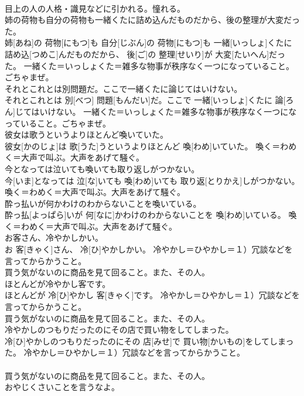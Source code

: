 \documentclass[8pt]{extreport}
\begin{document}
\begin{CJK}{UTF8}{min}
{\\	目上の人の人格・識見などに引かれる。憧れる。
\\	姉の荷物も自分の荷物も一緒くたに詰め込んだものだから、後の整理が大変だった。	
\\	姉[あね]の 荷物[にもつ]も 自分[じぶん]の 荷物[にもつ]も 一緒[いっしょ]くたに 詰め込[つめこ]んだものだから、 後[ご]の 整理[せいり]が 大変[たいへん]だった。	一緒くた＝いっしょくた＝雑多な物事が秩序なく一つになっていること。ごちゃまぜ。
\\	それとこれとは別問題だ。ここで一緒くたに論じてはいけない。	
\\	それとこれとは 別[べつ] 問題[もんだい]だ。ここで 一緒[いっしょ]くたに 論[ろん]じてはいけない。	一緒くた＝いっしょくた＝雑多な物事が秩序なく一つになっていること。ごちゃまぜ。
\\	彼女は歌うというよりほとんど喚いていた。	
\\	彼女[かのじょ]は 歌[うた]うというよりほとんど 喚[わめ]いていた。	喚く＝わめく＝大声で叫ぶ。大声をあげて騒ぐ。
\\	今となっては泣いても喚いても取り返しがつかない。	
\\	今[いま]となっては 泣[な]いても 喚[わめ]いても 取り返[とりかえ]しがつかない。	喚く＝わめく＝大声で叫ぶ。大声をあげて騒ぐ。
\\	酔っ払いが何かわけのわからないことを喚いている。	
\\	酔っ払[よっぱら]いが 何[なに]かわけのわからないことを 喚[わめ]いている。	喚く＝わめく＝大声で叫ぶ。大声をあげて騒ぐ。
\\	お客さん、冷やかしかい。	
\\	お 客[きゃく]さん、 冷[ひ]やかしかい。	冷やかし＝ひやかし＝１）冗談などを言ってからかうこと。 　　　　　　　　　　
\\	買う気がないのに商品を見て回ること。また、その人。
\\	ほとんどが冷やかし客です。	
\\	ほとんどが 冷[ひ]やかし 客[きゃく]です。	冷やかし＝ひやかし＝１）冗談などを言ってからかうこと。 　　　　　　　　　　
\\	買う気がないのに商品を見て回ること。また、その人。
\\	冷やかしのつもりだったのにその店で買い物をしてしまった。	
\\	冷[ひ]やかしのつもりだったのにその 店[みせ]で 買い物[かいもの]をしてしまった。	冷やかし＝ひやかし＝１）冗談などを言ってからかうこと。 　　　　　　　　　　
\\	買う気がないのに商品を見て回ること。また、その人。
\\	おやじくさいことを言うなよ。	
}
\end{CJK}
\end{document}
